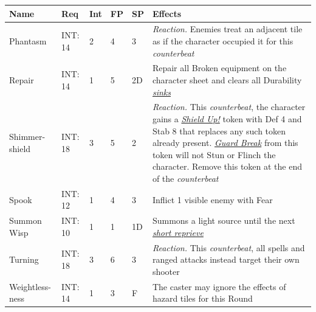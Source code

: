 \documentclass[12pt]{article}
\newcommand{\reftoit}[1]{\hyperlink{#1}{\emph{#1}}}
\begin{document}
\pagebreak

\begin{center}
\begin{tabularx}{\textwidth}{p{}p{}p{}p{}p{}p{}}
\hline
\rowcolor{white} \textbf{Name} & \textbf{Req} & \textbf{Int} & \textbf{FP} & \textbf{SP} & \textbf{Effects}\setcounter{rownum}{0}\\
\hline
Phantasm & INT: 14 & 2 & 4 & 3 & \emph{Reaction.} Enemies treat an adjacent tile as if the character occupied it for this \emph{counterbeat}\\
Repair & INT: 14 & 1 & 5 & 2D & Repair all Broken equipment on the character sheet and clears all Durability \reftoit{sinks} \\
Shimmer-\newline shield & INT: 18 & 3 & 5 & 2 & \emph{Reaction.} This \emph{counterbeat}, the character gains a \reftoit{Shield Up!} token with Def 4 and Stab 8 that replaces any such token already present. \reftoit{Guard Break} from this token will not Stun or Flinch the character. Remove this token at the end of the \emph{counterbeat}\\
Spook & INT: 12 & 1 & 4 & 3 & Inflict 1 visible enemy with Fear\\
Summon Wisp & INT: 10 & 1 & 1 & 1D & Summons a light source until the next \reftoit{short reprieve} \\
Turning & INT: 18 & 3 & 6 & 3 & \emph{Reaction.} This \emph{counterbeat}, all spells and ranged attacks instead target their own shooter\\
Weightless-\newline ness & INT: 14 & 1 & 3 & F & The caster may ignore the effects of hazard tiles for this Round\setcounter{rownum}{0}\\
\hline
\end{tabularx}
\end{center}

\pagebreak
\end{document}
